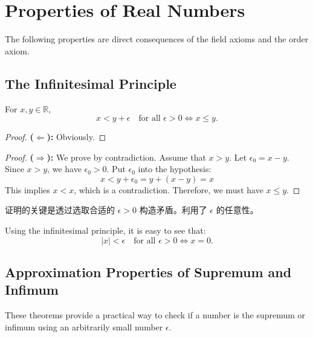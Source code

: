 \documentclass[
	UTF-8,
	11pt, %
	a4paper, %
]{LegrandOrangeBook}
\begin{document}
    \newpage

    \section{Properties of Real Numbers}

    The following properties are direct consequences of the field axioms and the order axiom.

    \subsection{The Infinitesimal Principle}

    \begin{theorem}
    For $x, y \in \mathbb{R}$,
    \[ x < y + \epsilon \quad \text{for all } \epsilon > 0 \iff x \le y. \]
    \end{theorem}

    \begin{proof}
    \textbf{($\Leftarrow$):} Obviously.
    \end{proof}
    \begin{proof}
        \textbf{($\Rightarrow$):}
        We prove by contradiction. 
        Assume that $x > y$. Let $\epsilon_0 = x - y$. Since $x > y$, we have $\epsilon_0 > 0$. 
        Put $\epsilon_0$ into the hypothesis:
        \[ x < y + \epsilon_0 = y + (x - y) = x \]
        This implies $x < x$, which is a contradiction. Therefore, we must have $x \le y$.
    \end{proof}

    \begin{remark}
        证明的关键是透过选取合适的 $\epsilon>0$ 构造矛盾。利用了 $\epsilon$ 的任意性。
    \end{remark}

    \begin{remark}
    Using the infinitesimal principle, it is easy to see that:
    \[ |x| < \epsilon \quad \text{for all } \epsilon > 0 \iff x = 0. \]
    \end{remark}

    \subsection{Approximation Properties of Supremum and Infimum }

    These theorems provide a practical way to check if a number is the supremum or infimum using an arbitrarily small number $\epsilon$.
\end{document}
